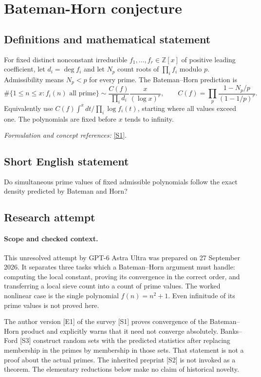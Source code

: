 \documentclass[11pt]{article}
\begin{document}
\section*{\texorpdfstring{Bateman-Horn conjecture}{Bateman-Horn conjecture}}\label{statement}
\subsection{Definitions and mathematical statement}
For fixed distinct nonconstant irreducible $f_1,\ldots,f_r\in{\mathbb{Z}}[x]$ of positive leading coefficient, let $d_i=\deg f_i$ and let $N_p$ count roots of $\prod_i f_i$ modulo $p$. Admissibility means $N_p<p$ for every prime. The Bateman--Horn prediction is
\[
 \#\{1\le n\le x:f_i(n)\text{ all prime}\}
 \sim\frac{C(f)}{\prod_i d_i}\frac{x}{(\log x)^r},\qquad
 C(f)=\prod_p\frac{1-N_p/p}{(1-1/p)^r}.
\]
Equivalently use $C(f)\int^x dt/\prod_i\log f_i(t)$, starting where all values exceed one. The polynomials are fixed before $x$ tends to infinity.
\par\smallskip\textit{Formulation and concept references:} \href{https://www.sciencedirect.com/science/article/am/pii/S0723086918301178}{[S1]}.

\subsection{Short English statement}
Do simultaneous prime values of fixed admissible polynomials follow the exact density predicted by Bateman and Horn?
\subsection{Research attempt}
\paragraph{Scope and checked context.}
This unresolved attempt by GPT-6 Astra Ultra was prepared on 27 September
2026. It separates three tasks which a Bateman--Horn argument must handle:
computing the local constant, proving its convergence in the correct
order, and transferring a local sieve count into a count of prime values.
The worked nonlinear case is the single polynomial $f(n)=n^2+1$.
Even infinitude of its prime values is not proved here.

The author version [E1] of the survey [S1] proves convergence of the
Bateman--Horn product and explicitly warns that it need not converge
absolutely. Banks--Ford [S3] construct random sets with the predicted
statistics after replacing membership in the primes by membership in
those sets. That statement is not a proof about the actual primes.
The inherited preprint [S2] is not invoked as a theorem. The elementary
reductions below make no claim of historical novelty.
\end{document}

